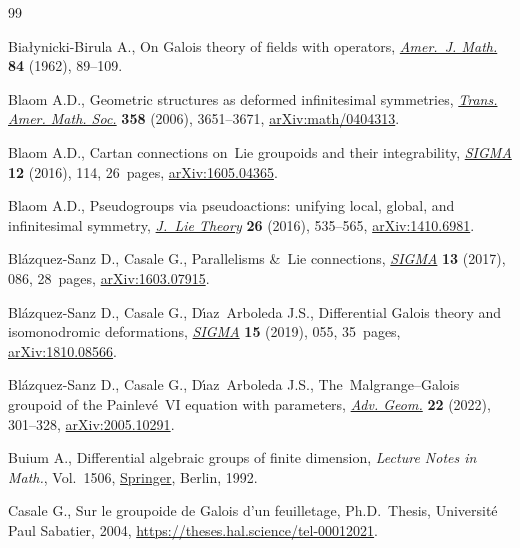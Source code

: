 \begin{thebibliography}{99}
\footnotesize\itemsep=0pt

Bia{\l}ynicki-Birula A., On {G}alois theory of fields with operators,
 \href{https://doi.org/10.2307/2372805}{\textit{Amer.~J. Math.}} \textbf{84}
 (1962), 89--109.

Blaom A.D., Geometric structures as deformed infinitesimal symmetries,
 \href{https://doi.org/10.1090/S0002-9947-06-04057-8}{\textit{Trans. Amer.
 Math. Soc.}} \textbf{358} (2006), 3651--3671,
 \href{https://arxiv.org/abs/math/0404313}{arXiv:math/0404313}.

Blaom A.D., Cartan connections on~{L}ie groupoids and their integrability,
 \href{https://doi.org/10.3842/SIGMA.2016.114}{\textit{SIGMA}} \textbf{12}
 (2016), 114, 26~pages,
 \href{https://arxiv.org/abs/1605.04365}{arXiv:1605.04365}.

Blaom A.D., Pseudogroups via pseudoactions: unifying local, global, and
 infinitesimal symmetry,
 \href{https://doi.org/10.5802/jolt.900}{\textit{J.~Lie Theory}} \textbf{26}
 (2016), 535--565, \href{https://arxiv.org/abs/1410.6981}{arXiv:1410.6981}.

Bl\'azquez-Sanz D., Casale G., Parallelisms \&~{L}ie connections,
 \href{https://doi.org/10.3842/SIGMA.2017.086}{\textit{SIGMA}} \textbf{13}
 (2017), 086, 28~pages,
 \href{https://arxiv.org/abs/1603.07915}{arXiv:1603.07915}.

Bl\'azquez-Sanz D., Casale G., D\'{\i}az~Arboleda J.S., Differential {G}alois
 theory and isomonodromic deformations,
 \href{https://doi.org/10.3842/SIGMA.2019.055}{\textit{SIGMA}} \textbf{15}
 (2019), 055, 35~pages,
 \href{https://arxiv.org/abs/1810.08566}{arXiv:1810.08566}.

Bl\'azquez-Sanz D., Casale G., D\'{\i}az~Arboleda J.S.,
 The~{M}algrange--{G}alois groupoid of the {P}ainlev\'e~{VI} equation with
 parameters, \href{https://doi.org/10.1515/advgeom-2022-0010}{\textit{Adv.
 Geom.}} \textbf{22} (2022), 301--328,
 \href{https://arxiv.org/abs/2005.10291}{arXiv:2005.10291}.

Buium A., Differential algebraic groups of finite dimension, \textit{Lecture
 Notes in Math.}, Vol.~1506,
 \href{https://doi.org/10.1007/BFb0087235}{Springer}, Berlin, 1992.

Casale G., Sur le groupoide de Galois d'un feuilletage, Ph.D.~Thesis,
 {U}niversit\'e Paul Sabatier, 2004,
 \url{https://theses.hal.science/tel-00012021}.


\end{thebibliography}
